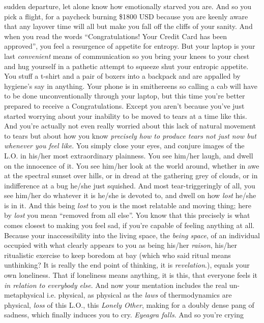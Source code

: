 \documentclass{article}
\begin{document}
sudden departure, let alone know how emotionally starved you are. And so
you pick a flight, for a paycheck burning \$1800 USD because you are
keenly aware that any layover time will all but make you fall off the
cliffs of your sanity. And when you read the words ``Congratulations!
Your Credit Card has been approved'', you feel a resurgence of appetite
for entropy. But your laptop is your last \textit{convenient} means of
communication so you bring your knees to your chest and hug yourself in
a pathetic attempt to squeeze shut your entropic appetite. You stuff
a t-shirt and a pair of boxers into a backpack and are appalled by
hygiene's say in anything. Your phone is in smithereens so calling a cab
will have to be done unconventionally through your laptop, but this time
you're better prepared to receive a Congratulations. Except you aren't
because you've just started worrying about your inability to be moved to
tears at a time like this. And you're actually not even really worried
about this lack of natural movement to tears but about how you know
\textit{precisely how to produce tears not just now but whenever you
feel like}. You simply close your eyes, and conjure images of the L.O.
in his/her most extraordinary plainness. You see him/her laugh, and
dwell on the innocence of it. You see him/her look at the world around,
whether in awe at the spectral sunset over hills, or in dread at the
gathering grey of clouds, or in indifference at a bug he/she just
squished. And most tear-triggeringly of all, you see him/her do whatever
it is he/she is devoted to, and dwell on how \textit{lost} he/she is in
it. And this being \textit{lost} to you is the most relatable and moving
thing; here by \textit{lost} you mean ``removed from all else''. You
know that this precisely is what comes closest to making you feel sad,
if you're capable of feeling anything at all. Because your
inaccessibility into the living space, the \textit{being space}, of an
individual occupied with what clearly appears to you as being his/her
\textit{raison}, his/her ritualistic exercise to keep boredom at bay
(which who said ritual means unthinking? It is really the end point of
thinking, it is \textit{revelation}.), equals your own loneliness. That
if loneliness means anything, it is this, that everyone feels it
\textit{in relation to everybody else}. And now your mentation includes
the real un-metaphysical i.e. physical, as physical as the \textit{laws}
of thermodynamics are physical, \textit{loss} of this L.O., this
\textit{Lonely Other}, making for a doubly dense pang of sadness, which
finally induces you to cry. \textit{Eyeagra falls}. And so you're crying
\end{document}
